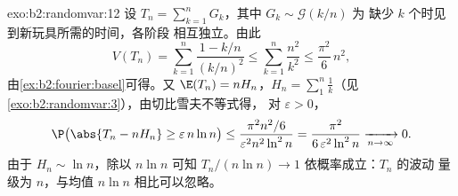 \begin{solution}{exo:b2:randomvar:12}
设 $T_n = \sum_{k=1}^nG_k$，其中 $G_k \sim \mathcal G(k/n)$ 为
缺少 $k$ 个时见到新玩具所需的时间，各阶段
相互独立。由此
\[
V(T_n) = \sum_{k=1}^n\frac{1 - k/n}{(k/n)^2}
\leq \sum_{k=1}^n\frac{n^2}{k^2}
\leq \frac{\pi^2}6\,n^2 ,
\]
由\cref{ex:b2:fourier:basel}可得。又 $\E(T_n) = nH_n$，$H_n =
\sum_1^n\frac1k$（见\cref{exo:b2:randomvar:3}），由切比雪夫不等式得，
对 $\varepsilon > 0$，
\[
\P\bigl(\abs{T_n - nH_n} \geq \varepsilon\,n\ln n\bigr)
\leq \frac{\pi^2n^2/6}{\varepsilon^2n^2\ln^2 n}
= \frac{\pi^2}{6\,\varepsilon^2\ln^2n}
\xrightarrow[n\to\infty]{} 0 .
\]
由于 $H_n \sim \ln n$，除以 $n\ln n$ 可知
$T_n/(n\ln n) \to 1$ 依概率成立：$T_n$ 的波动
量级为 $n$，与均值 $n\ln n$ 相比可以忽略。
\end{solution}

